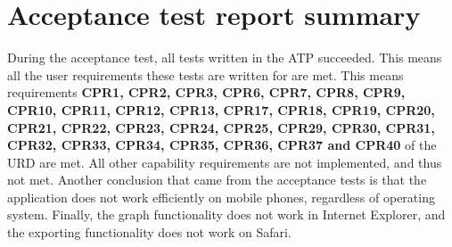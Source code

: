 \chapter{Acceptance test report summary}
\label{chap:testreports}

During the acceptance test, all tests written in the ATP\cite{atp} succeeded. This means all the user requirements these tests are written for are met. This means requirements \textbf{CPR1, CPR2, CPR3, CPR6, CPR7, CPR8, CPR9, CPR10, CPR11, CPR12, CPR13, CPR17, CPR18, CPR19, CPR20, CPR21, CPR22, CPR23, CPR24, CPR25, CPR29, CPR30, CPR31, CPR32, CPR33, CPR34, CPR35, CPR36, CPR37 and CPR40} of the URD\cite{urd} are met. All other capability requirements are not implemented, and thus not met. Another conclusion that came from the acceptance tests is that the application does not work efficiently on mobile phones, regardless of operating system. Finally, the graph functionality does not work in Internet Explorer, and the exporting functionality does not work on Safari.

